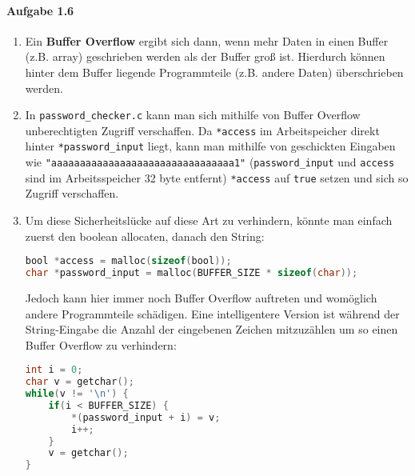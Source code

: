 \documentclass[11pt]{article}
\begin{document}
\paragraph{Aufgabe 1.6}
\begin{enumerate}[label=\alph*)]
\item Ein \textbf{Buffer Overflow} ergibt sich dann, wenn mehr Daten in einen Buffer (z.B. array) geschrieben werden als der Buffer groß ist. Hierdurch können hinter dem Buffer liegende Programmteile (z.B. andere Daten) überschrieben werden.

\item In \verb|password_checker.c| kann man sich mithilfe von Buffer Overflow unberechtigten Zugriff verschaffen. Da \verb|*access| im Arbeitspeicher direkt hinter \verb|*password_input| liegt, kann man mithilfe von geschickten Eingaben wie \verb|"aaaaaaaaaaaaaaaaaaaaaaaaaaaaaaaa1"| (\verb|password_input| und \verb|access| sind im Arbeitsspeicher 32 byte entfernt) \verb|*access| auf \verb|true| setzen und sich so Zugriff verschaffen.

\item Um diese Sicherheitslücke auf diese Art zu verhindern, könnte man einfach zuerst den boolean allocaten, danach den String:
\begin{lstlisting}[language=C]
bool *access = malloc(sizeof(bool));
char *password_input = malloc(BUFFER_SIZE * sizeof(char));
\end{lstlisting}
Jedoch kann hier immer noch Buffer Overflow auftreten und womöglich andere Programmteile schädigen. Eine intelligentere Version ist während der String-Eingabe die Anzahl der eingebenen Zeichen mitzuzählen um so einen Buffer Overflow zu verhindern:
\begin{lstlisting}[language=C]
int i = 0;
char v = getchar();
while(v != '\n') {
	if(i < BUFFER_SIZE) {
		*(password_input + i) = v;
		i++;
	}
	v = getchar();
}
\end{lstlisting}
\end{enumerate}
\end{document}
